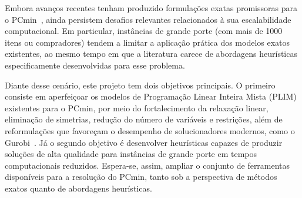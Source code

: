 Embora avanços recentes tenham produzido formulações exatas promissoras para o PCmin~\cite{catabriga2025}, ainda persistem desafios relevantes relacionados à sua escalabilidade computacional. Em particular, instâncias de grande porte (com mais de 1000 itens ou compradores) tendem a limitar a aplicação prática dos modelos exatos existentes, ao mesmo tempo em que a literatura carece de abordagens heurísticas especificamente desenvolvidas para esse problema.

Diante desse cenário, este projeto tem dois objetivos principais. O primeiro consiste em aperfeiçoar os modelos de Programação Linear Inteira Mista (PLIM) existentes para o PCmin, por meio do fortalecimento da relaxação linear, eliminação de simetrias, redução do número de variáveis e restrições, além de reformulações que favoreçam o desempenho de solucionadores modernos, como o Gurobi~\cite{gurobi}. Já o segundo objetivo é desenvolver heurísticas capazes de produzir soluções de alta qualidade para instâncias de grande porte em tempos computacionais reduzidos. Espera-se, assim, ampliar o conjunto de ferramentas disponíveis para a resolução do PCmin, tanto sob a perspectiva de métodos exatos quanto de abordagens heurísticas.


